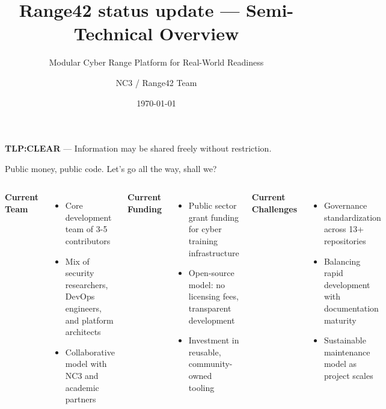 \documentclass[aspectratio=169]{beamer}
\title{\faIcon{shield-alt}\; Range42 status update — Semi-Technical Overview}
\subtitle{Modular Cyber Range Platform for Real-World Readiness}
\author{NC3 / Range42 Team}
\date{\today}
\institute{\faServer\; Proxmox \quad \faCogs\; Ansible \quad \faProjectDiagram\; Orchestration \quad \faBinoculars\; Telemetry}
\begin{document}
\begin{frame}
  \titlepage
  \vspace{-5mm}
  \begin{tcolorbox}
    \textbf{TLP:CLEAR} — Information may be shared freely without restriction.
  \end{tcolorbox}
\end{frame}

\begin{frame}{Public money, public code. Let's go all the way, shall we?}
  \begin{columns}[T]
    \textbf{Current Team}
    \begin{itemize}
      \item Core development team of 3-5 contributors
      \item Mix of security researchers, DevOps engineers, and platform architects
      \item Collaborative model with NC3 and academic partners
    \end{itemize}
    
    \textbf{Current Funding}
    \begin{itemize}
      \item Public sector grant funding for cyber training infrastructure
      \item Open-source model: no licensing fees, transparent development
      \item Investment in reusable, community-owned tooling
    \end{itemize}
    
    \textbf{Current Challenges}
    \begin{itemize}
      \item Governance standardization across 13+ repositories
      \item Balancing rapid development with documentation maturity
      \item Sustainable maintenance model as project scales
    \end{itemize}
    

\end{columns}
\end{frame}
\end{document}

